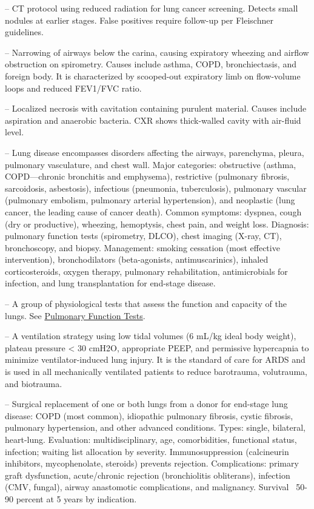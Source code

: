 -- CT protocol using reduced radiation for lung cancer screening. Detects small nodules at earlier stages. False positives require follow-up per Fleischner guidelines.

-- Narrowing of airways below the carina, causing expiratory wheezing and airflow obstruction on spirometry. Causes include asthma, COPD, bronchiectasis, and foreign body. It is characterized by scooped-out expiratory limb on flow-volume loops and reduced FEV1/FVC ratio.

-- Localized necrosis with cavitation containing purulent material. Causes include aspiration and anaerobic bacteria. CXR shows thick-walled cavity with air-fluid level.

-- Lung disease encompasses disorders affecting the airways, parenchyma, pleura, pulmonary vasculature, and chest wall. Major categories: obstructive (asthma, COPD—chronic bronchitis and emphysema), restrictive (pulmonary fibrosis, sarcoidosis, asbestosis), infectious (pneumonia, tuberculosis), pulmonary vascular (pulmonary embolism, pulmonary arterial hypertension), and neoplastic (lung cancer, the leading cause of cancer death). Common symptoms: dyspnea, cough (dry or productive), wheezing, hemoptysis, chest pain, and weight loss. Diagnosis: pulmonary function tests (spirometry, DLCO), chest imaging (X-ray, CT), bronchoscopy, and biopsy. Management: smoking cessation (most effective intervention), bronchodilators (beta-agonists, antimuscarinics), inhaled corticosteroids, oxygen therapy, pulmonary rehabilitation, antimicrobials for infection, and lung transplantation for end-stage disease.

-- A group of physiological tests that assess the function and capacity of the lungs. See \hyperlink{Pulmonary Function Tests}{Pulmonary Function Tests}.

-- A ventilation strategy using low tidal volumes (6 mL/kg ideal body weight), plateau pressure < 30 cmH2O, appropriate PEEP, and permissive hypercapnia to minimize ventilator-induced lung injury. It is the standard of care for ARDS and is used in all mechanically ventilated patients to reduce barotrauma, volutrauma, and biotrauma.

-- Surgical replacement of one or both lungs from a donor for end-stage lung disease: COPD (most common), idiopathic pulmonary fibrosis, cystic fibrosis, pulmonary hypertension, and other advanced conditions. Types: single, bilateral, heart-lung. Evaluation: multidisciplinary, age, comorbidities, functional status, infection; waiting list allocation by severity. Immunosuppression (calcineurin inhibitors, mycophenolate, steroids) prevents rejection. Complications: primary graft dysfunction, acute/chronic rejection (bronchiolitis obliterans), infection (CMV, fungal), airway anastomotic complications, and malignancy. Survival ~50-90 percent at 5 years by indication.

